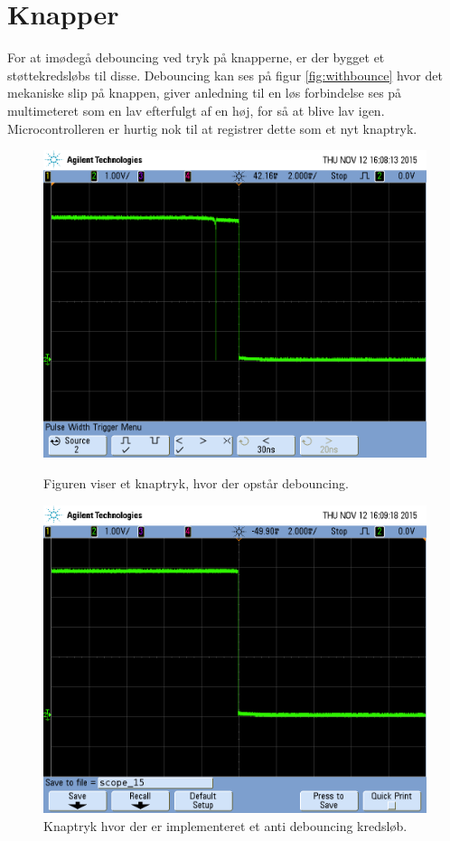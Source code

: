 \section{Knapper} \label{title:buttons}
For at imødegå debouncing ved tryk på knapperne, er der bygget et støttekredsløbs til disse. Debouncing kan ses på figur \ref{fig:withbounce} hvor det mekaniske slip på knappen, giver anledning til en løs forbindelse ses på multimeteret som en lav efterfulgt af en høj, for så at blive lav igen. Microcontrolleren er hurtig nok til at registrer dette som et nyt knaptryk.
\begin{figure}[H]
	\begin{minipage}{0.50\textwidth}
		\includegraphics[width = \textwidth]{billeder/scope_14.png}
		\caption{Figuren viser et knaptryk, hvor der opstår debouncing.}\label{fig:withbounce}
	\end{minipage}
	\begin{minipage}{0.50\textwidth}
		\includegraphics[width = \textwidth]{billeder/scope_15.png}
		\caption{Knaptryk hvor der er implementeret et anti debouncing kredsløb.}\label{fig:withoutbounce}
	\end{minipage}
\end{figure}

